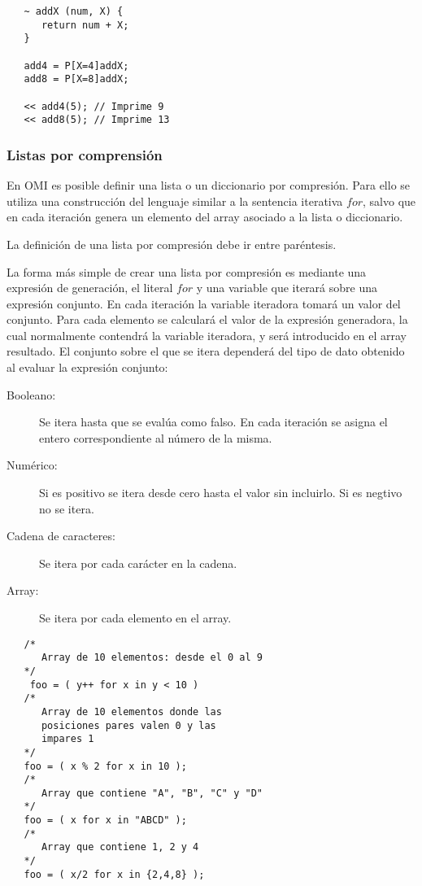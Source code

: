 \begin{lstlisting}
   ~ addX (num, X) {
      return num + X;
   }
   
   add4 = P[X=4]addX;
   add8 = P[X=8]addX;
   
   << add4(5); // Imprime 9
   << add8(5); // Imprime 13
\end{lstlisting}

\subsubsection{Listas por comprensión}
En OMI es posible definir una lista o un diccionario por compresión. Para ello se utiliza una construcción del
lenguaje similar a la sentencia iterativa $for$, salvo que en cada iteración genera un elemento del array 
asociado a la lista o diccionario. 

La definición de una lista por compresión debe ir entre paréntesis.

La forma más simple de crear una lista por compresión es mediante una expresión de generación, 
el literal $for$ y una variable que iterará sobre una expresión conjunto. En cada iteración la variable 
iteradora tomará un valor del conjunto. Para cada elemento se calculará el valor de 
la expresión generadora, la cual normalmente contendrá la variable iteradora, y será introducido en 
el array resultado. El conjunto sobre el que se itera dependerá del tipo de dato obtenido al evaluar la expresión conjunto:

\begin {description}
\item [Booleano:] Se itera hasta que se evalúa como falso. En cada iteración se asigna el entero correspondiente al número de la misma.
\item [Numérico:] Si es positivo se itera desde cero hasta el valor sin incluirlo. Si es negtivo no se itera.
\item [Cadena de caracteres:] Se itera por cada carácter en la cadena.
\item [Array:] Se itera por cada elemento en el array.
\end{description}

\begin{lstlisting}
   /*
      Array de 10 elementos: desde el 0 al 9
   */
    foo = ( y++ for x in y < 10 )
   /*
      Array de 10 elementos donde las 
      posiciones pares valen 0 y las
      impares 1
   */
   foo = ( x % 2 for x in 10 ); 
   /*
      Array que contiene "A", "B", "C" y "D"
   */
   foo = ( x for x in "ABCD" ); 
   /*
      Array que contiene 1, 2 y 4
   */
   foo = ( x/2 for x in {2,4,8} ); 
\end{lstlisting}



